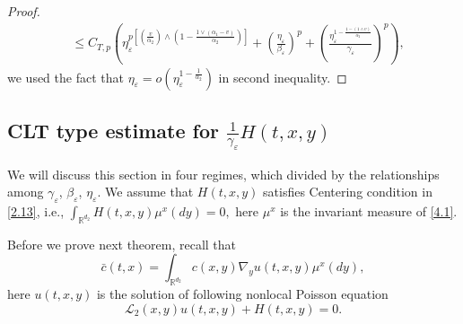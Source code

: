 \documentclass[11pt,reqno]{amsart}
\numberwithin{equation}{section}
\begin{document}
\begin{proof}
\begin{align}
		&\leq  C_{T,p}\left(\eta_{\varepsilon}^{p\left[ \left( \frac{v}{\alpha_{2}}\right) \wedge \left( 1-\frac{1\vee(\alpha_{1}-v)}{\alpha_{2}}\right) \right] }+\left( \frac{\eta_{\varepsilon}}{\beta_{\varepsilon}}\right)^{p} + \left( \frac{\eta_{\varepsilon}^{1-\frac{1-(1\wedge v)}{\alpha_{2}}}}{\gamma_{\varepsilon}}\right)^{p}\right),\label{5.55}
\end{align}
we used the fact that   $\eta_{\varepsilon}=o(\eta_{\varepsilon}^{1-\frac{1}{\alpha_{2}}})$ in second inequality.
\end{proof}



\subsection{CLT type estimate for $\frac{1}{\gamma_{\varepsilon}}H(t,x,y)$}



We will discuss this section in four regimes, which divided by the relationships among $\gamma_{\varepsilon}$, $\beta_{\varepsilon}$, $\eta_{\varepsilon}$.
We assume that $H(t,x,y)$ satisfies Centering condition in \eqref{2.13}, i.e., $\int_{\mathbb{R}^{ d_{2}}}H(t,x,y)\mu^{x}(dy)=0,$
here $\mu^{x}$ is the invariant measure of \eqref{4.1}. 

Before we prove next theorem, recall that
\begin{equation}
\bar{c}(t,x)=\int_{\mathbb{R}^{ d_{2}}}c(x,y)\nabla_{y}u(t,x,y)\mu^{x}(dy),
\nonumber
\end{equation}
here $u(t,x,y)$ is the solution of following nonlocal Poisson equation
\begin{equation}\label{5.59-1}
\mathcal{L}_{2}(x,y)u(t,x,y)+H(t,x,y)=0.
\end{equation}
\end{document}

